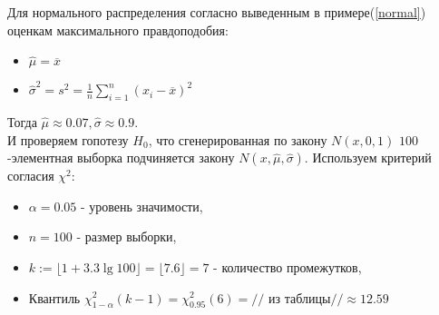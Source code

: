 \documentclass[../body.tex]{subfiles}
\begin{document}
		Для нормального распределения согласно выведенным в примере(\ref{normal}) оценкам максимального правдоподобия:
		\begin{itemize}
			\item $\hat{\mu} = \overline{x} $
			\item $\hat{\sigma}^2 = s^2 = \frac{1}{n}\sum_{i = 1}^{n}(x_i - \overline{x})^2$
		\end{itemize}
	Тогда $\hat{\mu} \approx 0.07, \hat{\sigma} \approx 0.9$.\\ И проверяем гопотезу $H_0$, что сгенерированная по закону $N(x, 0, 1)$ $100$-элементная выборка подчиняется закону $N(x, \hat{\mu}, \hat{\sigma})$.
	Используем критерий согласия $\chi^2$:
	\begin{itemize}
		\item $\alpha = 0.05$ - уровень значимости,
		\item $n = 100$ - размер выборки,
		\item $k := \lfloor1+3.3\lg 100\rfloor = \lfloor7.6\rfloor = 7$ - количество промежутков,
		\item Квантиль $\chi_{1 - \alpha}^2(k - 1) = \chi_{0.95}^2(6) = //$ из таблицы\cite[с.~358]{math}$// \approx 12.59$
	\end{itemize}
\end{document}

